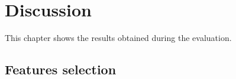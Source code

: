 \chapter{Discussion}

This chapter shows the results obtained during the evaluation. 

\section{Features selection}

